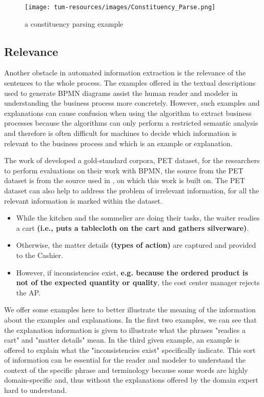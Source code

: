 \begin{figure}[h]
    \centering
    \caption{a constituency parsing example}
    \label{img:con_par}
    \texttt{[image: tum-resources/images/Constituency\_Parse.png]}
\end{figure}
 

\subsection{Relevance}
\label{sec:solution:relevance}
Another obstacle in automated information extraction is the relevance of the sentences to the whole process. The examples offered in the textual descriptions used to generate BPMN diagrams assist the human reader and modeler in understanding the business process more concretely. However, such examples and explanations can cause confusion when using the algorithm to extract business processes because the algorithms can only perform a restricted semantic analysis and therefore is often difficult for machines to decide which information is relevant to the business process and which is an example or explanation. 

The work of \cite{pet_dataset} developed a gold-standard corpora, PET dataset, for the researchers to perform evaluations on their work with BPMN, the source from the PET dataset is from the source used in \cite{t2m_1}, on which this work is built on. The PET dataset can also help to address the problem of irrelevant information, for all the relevant information is marked within the dataset. 

\begin{itemize}
    \item While the kitchen and the sommelier are doing their tasks, the waiter readies a cart \textbf{(i.e., puts a tablecloth on the cart and gathers silverware)}.
    \item Otherwise, the matter details \textbf{(types of action)} are captured and provided to the Cashier.
    \item However, if inconsistencies exist, \textbf{e.g. because the ordered product is not of the expected quantity or quality}, the cost center manager rejects the AP.
\end{itemize}

We offer some examples here to better illustrate the meaning of the information about the examples and explanations. In the first two examples, we can see that the explanation information is given to illustrate what the phrases "readies a cart" and "matter details" mean. In the third given example, an example is offered to explain what the "inconsistencies exist" specifically indicate. This sort of information can be essential for the reader and modeler to understand the context of the specific phrase and terminology because some words are highly domain-specific and, thus without the explanations offered by the domain expert hard to understand. 

